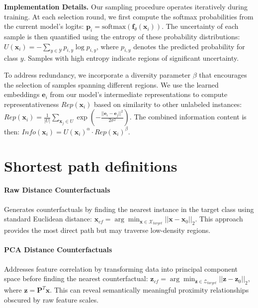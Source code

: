 \documentclass[sigconf,anonymous]{aamas}
\begin{document}
\textbf{Implementation Details.} Our sampling procedure operates iteratively during training. At each selection round, we first compute the softmax probabilities from the current model's logits: $\mathbf{p}_i = \text{softmax}(\mathbf{f}_\theta(\mathbf{x}_i))$. The uncertainty of each sample is then quantified using the entropy of these probability distributions: $U(\mathbf{x}_i) = -\sum_{y \in \mathcal{Y}} p_{i,y} \log p_{i,y}$, where $p_{i,y}$ denotes the predicted probability for class $y$. Samples with high entropy indicate regions of significant uncertainty.

To address redundancy, we incorporate a diversity parameter $\beta$ that encourages the selection of samples spanning different regions. We use the learned embeddings $\mathbf{e}_i$ from our model's intermediate representations to compute representativeness $Rep(\mathbf{x}_i)$ based on similarity to other unlabeled instances: $Rep(\mathbf{x}_i) = \frac{1}{|U|} \sum_{\mathbf{x}_j \in U} \exp\left(-\frac{||\mathbf{e}_i - \mathbf{e}_j||^2}{2\sigma^2}\right)$. The combined information content is then: $Info(\mathbf{x}_i) = U(\mathbf{x}_i)^\alpha \cdot Rep(\mathbf{x}_i)^\beta$.

\section{Shortest path definitions}
\paragraph{Raw Distance Counterfactuals}
Generates counterfactuals by finding the nearest instance in the target class using standard Euclidean distance: $\mathbf{x}_{cf} = \arg\min_{\mathbf{x} \in \mathcal{X}_{target}} ||\mathbf{x} - \mathbf{x}_0||_2$. This approach provides the most direct path but may traverse low-density regions.

\paragraph{PCA Distance Counterfactuals}
Addresses feature correlation by transforming data into principal component space before finding the nearest counterfactual: $\mathbf{z}_{cf} = \arg\min_{\mathbf{z} \in \mathcal{Z}_{target}} ||\mathbf{z} - \mathbf{z}_0||_2$, where $\mathbf{z} = \mathbf{P}^T\mathbf{x}$. This can reveal semantically meaningful proximity relationships obscured by raw feature scales.
\end{document}

